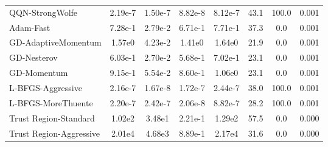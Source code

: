 \documentclass{article}
\begin{document}
\begin{table}[htbp]
{\begin{tabular}{p{2.5cm}*{7}{c}}
QQN-StrongWolfe & 2.19e-7 & 1.50e-7 & 8.82e-8 & 8.12e-7 & 43.1 & 100.0 & 0.001 \\
Adam-Fast & 7.28e-1 & 2.79e-2 & 6.71e-1 & 7.71e-1 & 37.3 & 0.0 & 0.001 \\
GD-AdaptiveMomentum & 1.57e0 & 4.23e-2 & 1.41e0 & 1.64e0 & 21.9 & 0.0 & 0.001 \\
GD-Nesterov & 6.03e-1 & 2.70e-2 & 5.68e-1 & 7.02e-1 & 23.1 & 0.0 & 0.001 \\
GD-Momentum & 9.15e-1 & 5.54e-2 & 8.60e-1 & 1.06e0 & 23.1 & 0.0 & 0.001 \\
L-BFGS-Aggressive & 2.16e-7 & 1.67e-8 & 1.72e-7 & 2.44e-7 & 38.0 & 100.0 & 0.001 \\
L-BFGS-MoreThuente & 2.20e-7 & 2.42e-7 & 2.06e-8 & 8.82e-7 & 28.2 & 100.0 & 0.001 \\
Trust Region-Standard & 1.02e2 & 3.48e1 & 2.21e-1 & 1.29e2 & 57.5 & 0.0 & 0.000 \\
Trust Region-Aggressive & 2.01e4 & 4.68e3 & 8.89e-1 & 2.17e4 & 31.6 & 0.0 & 0.000 \\
\bottomrule
\end{tabular}
}
\end{table}
\end{document}
